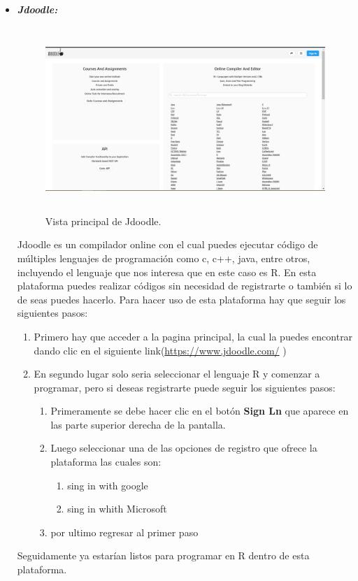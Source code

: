 \documentclass{article}
\begin{document}
\begin{itemize}

\item \textbf{\textit{Jdoodle: }} 
\begin{figure}[H]
\centering
\includegraphics[width=12cm,height=7cm]{imagenes/Jdoodle.png}
\caption{\label{fig2:frog}Vista principal de Jdoodle.}
\end{figure}
Jdoodle es un compilador online con el cual puedes ejecutar código de múltiples lenguajes de programación como c, c++, java, entre otros, incluyendo el lenguaje que nos interesa  que en este caso es R. En esta plataforma puedes realizar códigos sin necesidad de registrarte o también si lo de seas puedes hacerlo.  Para hacer uso de esta plataforma hay que seguir los siguientes pasos: 
\begin{enumerate}
    \item Primero hay que acceder a la pagina principal, la cual la puedes encontrar dando clic en el siguiente link(\url{https://www.jdoodle.com/} )
    \item En segundo lugar solo seria seleccionar el lenguaje R y comenzar a programar, pero si deseas registrarte puede seguir los siguientes pasos: 
    \begin{enumerate}
        \item  Primeramente se debe hacer clic en el botón \textbf{Sign Ln} que aparece en las parte superior derecha de la pantalla.
        \item Luego seleccionar una de las opciones de registro que ofrece la plataforma las cuales son:
        \begin{enumerate}
            \item sing in with google
            \item sing in whith Microsoft
        \end{enumerate}
        \item por ultimo regresar al primer paso
    \end{enumerate}
\end{enumerate}
Seguidamente ya estarían listos para programar en R dentro de esta plataforma.


\end{itemize}
\end{document}
